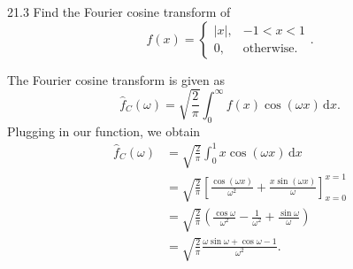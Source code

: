 
\begin{problem}{21.3}
  Find the Fourier cosine transform of
  \begin{equation*}
    f(x) = \begin{cases}
      \left| x \right|, &  -1 < x < 1\\
    0,  & \text{otherwise}
    .\end{cases}
  .\end{equation*}
\end{problem}

\begin{derivation}
  The Fourier cosine transform is given as
  \begin{equation*}
    \hat{f}_C(\omega) = \sqrt{\frac{2}{\pi}} \int_{0}^{\infty} f(x) \cos (\omega x) \, \mathrm{d}x 
  .\end{equation*}
  Plugging in our function, we obtain
  \begin{align*}
    \hat{f}_C(\omega) &= \sqrt{\frac{2}{\pi}} \int_{0}^{1} x \cos (\omega x) \, \mathrm{d}x \\
                      &= \sqrt{\frac{2}{\pi}} \left[ \frac{\cos (\omega  x)}{\omega ^2}+\frac{x \sin (\omega  x)}{\omega } \right]_{x = 0}^{x = 1} \\
                      &= \sqrt{\frac{2}{\pi}} \left( \frac{\cos \omega}{\omega^2} - \frac{1}{\omega^2} + \frac{\sin \omega}{\omega}  \right) \\
                      &= \sqrt{\frac{2}{\pi}} \frac{\omega \sin \omega + \cos \omega - 1}{\omega^2}
  .\end{align*}
\end{derivation}


